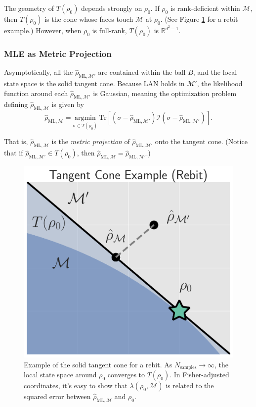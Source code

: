 \documentclass[aps,pra, twocolumn]{revtex4-1}
\newcommand{\M}{\mathcal{M}}
\newcommand{\rhohat}{\hat{\rho}}
\newcommand{\rhoML}[1]{\rhohat_{\scriptscriptstyle{\mathrm{ML},#1}}}
\begin{document}
The geometry of $T(\rho_{0})$ depends strongly on $\rho_{0}$. If $\rho_{0}$ is rank-deficient within $\M$, then $T(\rho_{0})$ is the cone whose faces touch $\M$ at $\rho_{0}$. (See Figure \ref{fig:tangentcone} for a rebit example.) However, when $\rho_{0}$ is full-rank, $T(\rho_{0})$ is $\mathbb{R}^{d^{2}-1}$.

\subsubsection{MLE as Metric Projection}

Asymptotically, all the $\rhoML{\M'}$ are contained within the ball $B$, and the local state space is the solid tangent cone. Because LAN holds in $\M'$, the likelihood function around each $\rhoML{\M'}$ is Gaussian, meaning the optimization problem defining $\rhoML{\M}$ is given by \begin{equation}
\label{eq:lampnmle2}
\rhoML{\M} = \underset{\sigma \in T(\rho_{0})}{\text{argmin}}~\mathrm{Tr}[(\sigma  -\rhoML{\M'})\mathcal{I}(\sigma  -\rhoML{\M'})].
\end{equation}

That is, $\rhoML{\M}$ is the \emph{metric projection} of $\rhoML{\M'}$ onto the tangent cone. (Notice that if $\rhoML{\M'} \in T(\rho_{0})$, then $\rhoML{\M} = \rhoML{\M'}$.)

\begin{figure}
\includegraphics[width=.75\columnwidth]{Images/Figure_temp.pdf}
 \caption{Example of the solid tangent cone for a rebit. As $N_{\mathrm{samples}} \rightarrow \infty$, the local state space around $\rho_{0}$ converges to $T(\rho_{0})$. In Fisher-adjusted coordinates, it's easy to show that $\lambda(\rho_{0}, \M)$ is related to the squared error between $\rhoML{\M}$ and $\rho_{0}$.}
\label{fig:tangentcone}
\end{figure}
\end{document}
